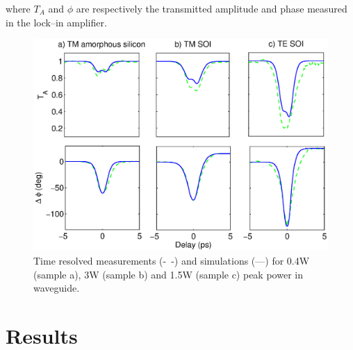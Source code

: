 \documentclass[10pt,letterpaper]{article}
\begin{document}
where $T_A$ and $\phi$ are respectively the transmitted amplitude and phase measured in the lock--in amplifier.


\begin{figure}[htb]
    \centering
    \includegraphics[width=1.00\textwidth]{timeRes_simulations_AmorfoTm10mmP13b_0p5w_SOI_2w__new}
    \caption{Time resolved measurements (-~-) and simulations (---) for 0.4W (sample a), 3W (sample b) and 1.5W (sample c) peak power in waveguide.}
    \label{fig:timeResolvesSimulations}
\end{figure}



\section{Results}
\end{document}
